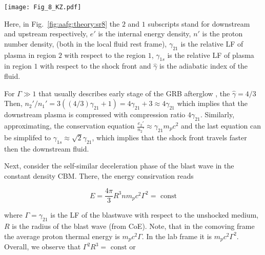 \begin{figure*}[t]
    \centering 
    \texttt{[image: Fig\_8\_KZ.pdf]}
    \caption{
        This is a schematic sketch of a pair of shocks produced when a relativistic
        jet from a \ac{GRB} collides with the \ac{CBM}, as viewed from the
        rest frame of unshocked \ac{CBM}. Regions 2 \& 3 represent shocked \ac{CBM} and \ac{GRB}
        jet respectively. They move together with the same \ac{LF} ($\gamma_2$, as viewed
        by a stationary observer in the unshocked \ac{CBM}), and have the same pressure but
        different densities.
        (Adapted from \citet{Kumar:2014upa}, Fig.~8)
    }
    \label{fig:aafg:theory:sr8}
\end{figure*}

Here, in Fig.~\ref{fig:aafg:theory:sr8}  the $2$ and $1$ subscripts stand for downstream and upstream respectively, $e'$ is the internal energy density, $n'$ is the proton number density, (both in the local fluid rest frame), $\gamma_{21}$ is the relative \ac{LF} of plasma in region $2$ with respect to the region $1$, $\gamma_{1s}$ is the relative \ac{LF} of plasma in region $1$ with respect to the shock front and $\hat{\gamma}$ is the adiabatic index of the fluid.

For $\Gamma\gg1$ that usually describes early stage of the \ac{GRB} afterglow \cite{Piran:1999kx}, the $\hat{\gamma}=4/3$ 
Then, $n_2'/n_1' = 3 ((4/3)\gamma_{21} + 1) = 4\gamma_{21} + 3 \approx 4\gamma_{21}$ which implies that the downstream plasma is compressed with compression ratio $4\gamma_{21}$.
Similarly, approximating, the conservation equation $\frac{e_2'}{n_2'} \approx \gamma_{21} m_p c^2$ and the last equation can be simplifed to $\gamma_{1s} \approx \sqrt{2} \gamma_{21}$, which implies that the shock front travels faster then the downstream fluid.

Next, consider the self-similar deceleration phase of the blast wave in the constant density \ac{CBM}. There, the energy consirvation reads 

\begin{equation}
E = \frac{4 \pi }{3 } R^3 n m_p c^2 \Gamma^2 = \text{ const}
\end{equation}

where $\Gamma = \gamma_{21}$ is the \ac{LF} of the blastwave with respect to the unshocked medium, $R$ is the radius of the blast wave (from \ac{CoE}).
Note, that in the comoving frame the average proton thermal energy is $m_p c^2 \Gamma$. 
In the lab frame it is $m_p c^2 \Gamma^2$. 
Overall, we observe that $\Gamma^2 R^3 = \text{ const}$ or 

